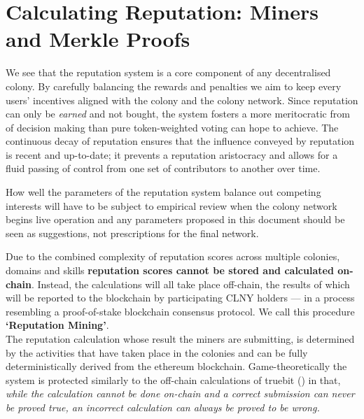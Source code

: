 
\section{Calculating Reputation: Miners and Merkle Proofs}\label{sec:reputationmining}
We see that the reputation system is a core component of any decentralised colony. By carefully balancing the rewards and penalties we aim to keep every users' incentives aligned with the colony and the colony network. Since reputation can only be \emph{earned} and not bought, the system fosters a more meritocratic from of decision making than pure token-weighted voting can hope to achieve. The continuous decay of reputation ensures that the influence conveyed by reputation is recent and up-to-date; it prevents a reputation aristocracy and allows for a fluid passing of control from one set of contributors to another over time.

How well the parameters of the reputation system balance out competing interests will have to be subject to empirical review when the colony network begins live operation and any parameters proposed in this document should be seen as suggestions, not prescriptions for the final network.

Due to the combined complexity of reputation scores across multiple colonies, domains and skills %
\textbf{reputation scores cannot be stored and calculated on-chain}. Instead, the calculations will all take place off-chain, the results of which will be reported to the blockchain by participating CLNY holders --- in a process resembling a proof-of-stake blockchain consensus protocol. We call this procedure \textbf{`Reputation Mining'}.\\
The reputation calculation whose result the miners are submitting, is determined by the activities that have taken place in the colonies and can be fully deterministically derived from the ethereum blockchain. Game-theoretically the system is protected similarly to the off-chain calculations of truebit (\cite{TruebitWhitepaper}) in that, \emph{while the calculation cannot be done on-chain and a correct submission can never be proved true, an incorrect calculation can always be proved to be wrong.}



